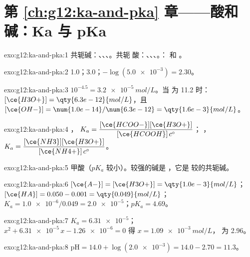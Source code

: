 \section*{第 \ref{ch:g12:ka-and-pka} 章——酸和碱：Ka 与 pKa}

\begin{solution}{exo:g12:ka-and-pka:1}
共轭碱：、、、。共轭
酸：、、、。：
和 。
\end{solution}

\begin{solution}{exo:g12:ka-and-pka:2}
 1.0；3.0；$-\log(\num{5.0e-3}) = 2.30$。
\end{solution}

\begin{solution}{exo:g12:ka-and-pka:3}
$10^{-4.5} = \qty{3.2e-5}{mol/L}$。当  为 11.2 时：
$[\ce{H3O+}] = \qty{6.3e-12}{mol/L}$，且
$[\ce{OH-}] = \num{1.0e-14}/\num{6.3e-12} = \qty{1.6e-3}{mol/L}$。
\end{solution}

\begin{solution}{exo:g12:ka-and-pka:4}
，
$K_a = \dfrac{[\ce{HCOO-}][\ce{H3O+}]}{[\ce{HCOOH}]\,c^\circ}$；
，
$K_a = \dfrac{[\ce{NH3}][\ce{H3O+}]}{[\ce{NH4+}]\,c^\circ}$。
\end{solution}

\begin{solution}{exo:g12:ka-and-pka:5}
甲酸（$pK_a$ 较小）。较强的碱是 ，它是
较的共轭碱。
\end{solution}

\begin{solution}{exo:g12:ka-and-pka:6}
$[\ce{A-}] = [\ce{H3O+}] = \qty{1.0e-3}{mol/L}$；
$[\ce{HA}] = 0.050 - 0.001 = \qty{0.049}{mol/L}$；
$K_a = \num{1.0e-6}/0.049 = \num{2.0e-5}$；$pK_a = 4.69$。
\end{solution}

\begin{solution}{exo:g12:ka-and-pka:7}
$K_a = \num{6.31e-5}$；$x^2 + \num{6.31e-5}\,x - \num{1.26e-6} = 0$ 得
$x = \qty{1.09e-3}{mol/L}$， 为 2.96。
\end{solution}

\begin{solution}{exo:g12:ka-and-pka:8}
$\mathrm{pH} = 14.0 + \log(\num{2.0e-3}) = 14.0 - 2.70 = 11.3$。
\end{solution}

